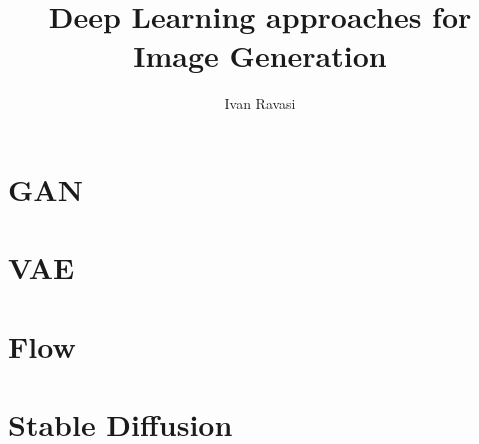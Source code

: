 \documentclass{beamer}
\title[Image generation through DL]{Deep Learning approaches for Image Generation}
\author[I. Ravasi]{Ivan Ravasi}
\begin{document}
    \frame{\titlepage}
    \section{GAN}
    
    \section{VAE}
    \section{Flow}
    \section{Stable Diffusion}
\end{document}

